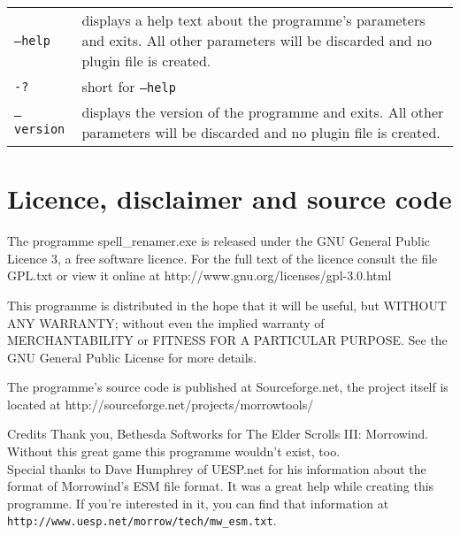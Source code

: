 \documentclass[12pt,oneside,a4paper]{article}
\begin{document}
\newline
\begin{tabular}{p{7cm} p{8cm}}
\texttt{--help}                   & displays a help text about the programme's parameters and exits. All other parameters will be discarded and no plugin file is created.\\
\texttt{-?}                       & short for \texttt{--help}\\
\texttt{--version}                & displays the version of the programme and exits. All other parameters will be discarded and no plugin file is created.\\
\end{tabular}

\section{Licence, disclaimer and source code}
The programme spell\_renamer.exe is released under the GNU General Public Licence 3,
a free software licence. For the full text of the licence consult the file GPL.txt
or view it online at http://www.gnu.org/licenses\slash gpl-3.0.html

This programme is distributed in the hope that it will be useful, but WITHOUT ANY
WARRANTY; without even the implied warranty of MERCHANTABILITY or FITNESS FOR A
PARTICULAR PURPOSE. See the GNU General Public License for more details.

The programme's source code is published at Sourceforge.net, the project itself
is located at http://sourceforge.net/projects/morrowtools/

\begin{section}{Credits}
Thank you, Bethesda Softworks for The Elder Scrolls III: Morrowind.
Without this great game this programme wouldn't exist, too.\\
Special thanks to Dave Humphrey of UESP.net for his information about the format
of Morrowind's ESM file format. It was a great help while creating this programme.
If you're interested in it, you can find that information at  \texttt{http://www.uesp.net\slash morrow\slash tech\slash{}mw\_esm.txt}.
\end{section}
\end{document}
